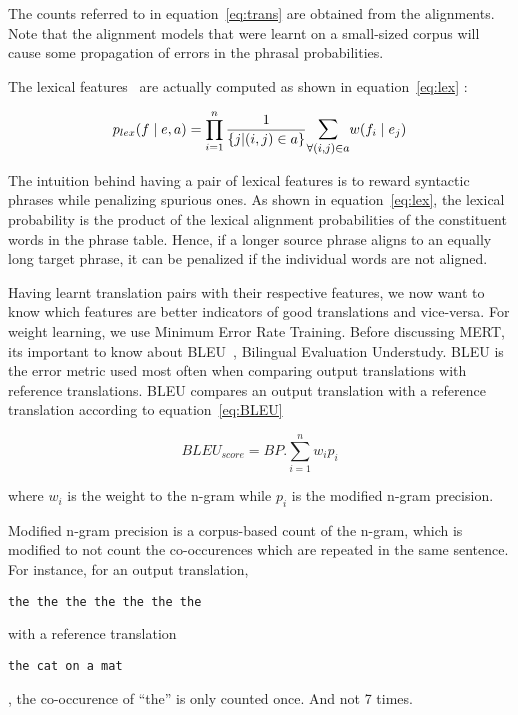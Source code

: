 The counts referred to in equation~\eqref{eq:trans} are obtained from the alignments. Note that the alignment models that were learnt on a small-sized corpus will cause some propagation of errors in the phrasal probabilities. 

The lexical features~\cite{Koehn:03} are actually computed as shown in equation~\eqref{eq:lex} : 

\begin{equation} \label{eq:lex}
	p_{lex}(f \mid e, a) = \prod\limits_{i=1}^{n} \frac{1}{\{j | (i,j) \in a\}}
	\mathlarger{\sum\limits_{\forall (i,j) \in a}} w(f_{i} \mid e_{j})
\end{equation}


The intuition behind having a pair of lexical features is to reward syntactic phrases while penalizing spurious ones. As shown in equation~\eqref{eq:lex}, the lexical probability is the product of the lexical alignment probabilities of the constituent words in the phrase table. Hence, if a longer source phrase aligns to an equally long target phrase, it can be penalized if the individual words are not aligned. 

Having learnt translation pairs with their respective features, we now want to know which features are better indicators of good translations and vice-versa. For weight learning, we use Minimum Error Rate Training. Before discussing MERT, its important to know about BLEU~\cite{Papineni:02}, Bilingual Evaluation Understudy. BLEU is the error metric used most often when comparing output translations with reference translations. BLEU compares an output translation with a reference translation according to equation~\eqref{eq:BLEU}

\begin{equation} \label{eq:BLEU}
	BLEU_{score} = BP. \sum\limits_{i=1}^n w_{i}p_{i}
\end{equation}

where $w_{i}$ is the weight to the n-gram while $p_{i}$ is the modified n-gram precision. 

Modified n-gram precision is a corpus-based count of the n-gram, which is modified to not count the co-occurences which are repeated in the same sentence. For instance, for an output translation, \begin{verbatim}the the the the the the the\end{verbatim} with a reference translation \begin{verbatim}the cat on a mat\end{verbatim}, the co-occurence of ``the'' is only counted once. And not 7 times. 

